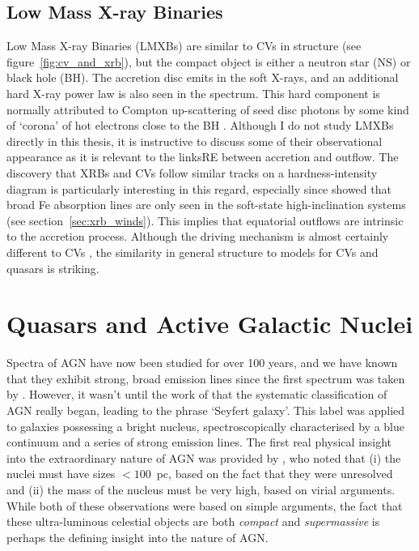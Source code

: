 \subsection{Low Mass X-ray Binaries}

Low Mass X-ray Binaries (LMXBs) 
are similar to CVs in structure (see figure~\ref{fig:cv_and_xrb}), 
but the compact object
is either a neutron star (NS) or black hole (BH). The accretion disc 
emits in the soft X-rays, and an additional hard X-ray power law is also 
seen in the spectrum. This hard component is normally attributed
to Compton up-scattering of seed disc photons by some kind of `corona'
of hot electrons close to the BH \citep[e.g.][]{white1988,mitsuda1989,uttley2014}.
Although I do not study LMXBs directly in this thesis, it is instructive
to discuss some of their observational appearance as it is relevant to the linksRE
between accretion and outflow. The discovery that XRBs and CVs follow similar 
tracks on a hardness-intensity diagram \citep{kordingDNjet2008}
is particularly interesting in this regard, especially since \cite{ponti2012}
showed that broad Fe absorption lines are only seen in the soft-state 
high-inclination systems (see section~\ref{sec:xrb_winds}). 
This implies that equatorial outflows are intrinsic to 
the accretion process. Although the driving mechanism
is almost certainly different to CVs \citep[e.g.][]{diaztrigo2015}, 
the similarity in general structure to models for CVs and quasars is striking.




\section{Quasars and Active Galactic Nuclei}

Spectra of AGN have now been studied for over 100 years, and we have known 
that they exhibit strong, broad emission lines since the first spectrum was taken by
\cite{fath1909}. However, it wasn't until the work of \cite{seyfert1943} that the systematic 
classification of AGN really began, leading to the phrase `Seyfert galaxy'.
This label was applied to galaxies possessing a bright nucleus, spectroscopically
characterised by a blue continuum and a series of strong emission lines.
The first real physical insight into the extraordinary nature of AGN
was provided by \cite{woltjer1959}, who noted that (i) the nuclei must have sizes $<100$~pc,
based on the fact that they were unresolved and (ii) the mass of the nucleus
must be very high, based on virial arguments. 
While both of these observations were based on simple arguments, the fact that these
ultra-luminous celestial objects are both {\em compact} and {\em supermassive}
is perhaps the defining insight into the nature of AGN.


